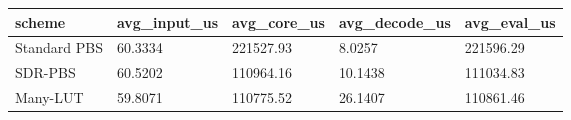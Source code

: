 \small
\setlength{\tabcolsep}{4pt}
\begin{tabular}{lllll}
\toprule
scheme & avg\_input\_us & avg\_core\_us & avg\_decode\_us & avg\_eval\_us \\
\midrule
Standard PBS & 60.3334 & 221527.93 & 8.0257 & 221596.29 \\
SDR-PBS & 60.5202 & 110964.16 & 10.1438 & 111034.83 \\
Many-LUT & 59.8071 & 110775.52 & 26.1407 & 110861.46 \\
\bottomrule
\end{tabular}
